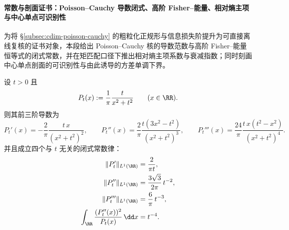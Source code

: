 \paragraph{常数与剖面证书：Poisson--Cauchy 导数闭式、高阶 Fisher--能量、相对熵主项与中心单点可识别性}
为将 \S\ref{subsec:cdim-poisson-cauchy} 的粗粒化正规形与信息损失阶提升为可直接离线复核的证书对象，本段给出 Poisson--Cauchy 核的导数范数与高阶 Fisher--能量恒等式的闭式常数，并在矩匹配口径下推出相对熵主项系数与衰减指数；同时刻画中心单点剖面的可识别性与由此诱导的方差单调下界。

\begin{proposition}\label{prop:cdim-poisson-kernel-derivative-l1-energy}
设 \(t>0\) 且
\[
P_t(x):=\frac{1}{\pi}\frac{t}{x^2+t^2}\qquad(x\in\RR).
\]
则其前三阶导数为
\[
P_t'(x)=-\frac{2}{\pi}\frac{t\,x}{(x^2+t^2)^2},\qquad
P_t''(x)=\frac{2}{\pi}\frac{t(3x^2-t^2)}{(x^2+t^2)^3},\qquad
P_t'''(x)=\frac{24}{\pi}\frac{t\,x(t^2-x^2)}{(x^2+t^2)^4}.
\]
并且成立四个与 \(t\) 无关的闭式常数律：
\begin{align}
\|P_t'\|_{L^{1}(\RR)}&=\frac{2}{\pi t},\label{eq:cdim-poisson-pt-prime-l1}\\
\|P_t''\|_{L^{1}(\RR)}&=\frac{3\sqrt3}{2\pi}\,t^{-2},\label{eq:cdim-poisson-pt-second-l1}\\
\|P_t'''\|_{L^{1}(\RR)}&=\frac{6}{\pi}\,t^{-3},\label{eq:cdim-poisson-pt-third-l1}\\
\int_{\RR}\frac{(P_t''(x))^{2}}{P_t(x)}\,\dd x&=t^{-4}.\label{eq:cdim-poisson-pt-second-energy}
\end{align}
\end{proposition}
